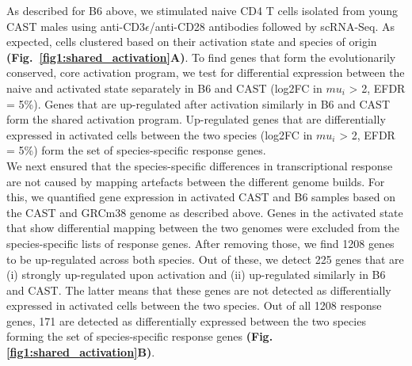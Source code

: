 As described for B6 above, we stimulated naive CD4\plus{} T cells isolated from young CAST males using anti-CD3$\epsilon$/anti-CD28 antibodies followed by scRNA-Seq. As expected, cells clustered based on their activation state and species of origin \textbf{(Fig.~\ref{fig1:shared_activation}A)}. To find genes that form the evolutionarily conserved, core activation program, we test for differential expression between the naive and activated state separately in B6 and CAST (log2FC in $mu_i$ > 2, EFDR = 5\%). Genes that are up-regulated after activation similarly in B6 and CAST form the shared activation program. Up-regulated genes that are differentially expressed in activated cells between the two species (log2FC in $mu_i$ > 2, EFDR = 5\%) form the set of species-specific response genes. \\

We next ensured that the species-specific differences in transcriptional response are not caused by mapping artefacts between the different genome builds. For this, we quantified gene expression in activated CAST and B6 samples based on the CAST and GRCm38 genome as described above. Genes in the activated state that show differential mapping between the two genomes were excluded from the species-specific lists of response genes. After removing those, we find 1208 genes to be up-regulated across both species. Out of these, we detect 225 genes that are (i) strongly up-regulated upon activation and (ii) up-regulated similarly in B6 and CAST. The latter means that these genes are not detected as differentially expressed in activated cells between the two species. Out of all 1208 response genes, 171 are detected as differentially expressed between the two species forming the set of species-specific response genes \textbf{(Fig. \ref{fig1:shared_activation}B)}.

\newpage

